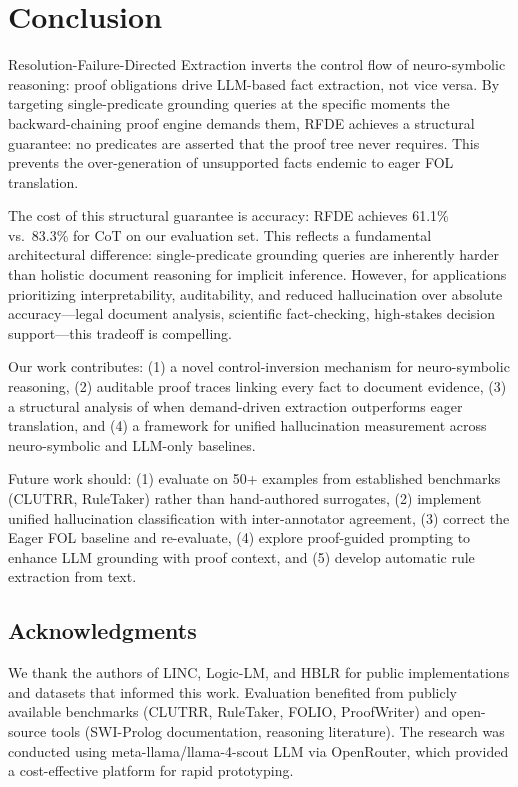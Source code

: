 \documentclass[11pt,letterpaper]{article}
\begin{document}
\section{Conclusion}

Resolution-Failure-Directed Extraction inverts the control flow of neuro-symbolic reasoning: proof obligations drive
LLM-based fact extraction, not vice versa. By targeting single-predicate grounding queries at the specific moments the
backward-chaining proof engine demands them, RFDE achieves a structural guarantee: no predicates are asserted that the proof
tree never requires. This prevents the over-generation of unsupported facts endemic to eager FOL translation.

The cost of this structural guarantee is accuracy: RFDE achieves 61.1\% vs.\ 83.3\% for CoT on our evaluation set. This
reflects a fundamental architectural difference: single-predicate grounding queries are inherently harder than holistic
document reasoning for implicit inference. However, for applications prioritizing interpretability, auditability, and reduced
hallucination over absolute accuracy---legal document analysis, scientific fact-checking, high-stakes decision support---this
tradeoff is compelling.

Our work contributes: (1) a novel control-inversion mechanism for neuro-symbolic reasoning, (2) auditable proof traces
linking every fact to document evidence, (3) a structural analysis of when demand-driven extraction outperforms eager
translation, and (4) a framework for unified hallucination measurement across neuro-symbolic and LLM-only baselines.

Future work should: (1) evaluate on 50+ examples from established benchmarks (CLUTRR, RuleTaker) rather than hand-authored
surrogates, (2) implement unified hallucination classification with inter-annotator agreement, (3) correct the Eager FOL
baseline and re-evaluate, (4) explore proof-guided prompting to enhance LLM grounding with proof context, and (5) develop
automatic rule extraction from text.

\subsection*{Acknowledgments}

We thank the authors of LINC, Logic-LM, and HBLR for public implementations and datasets that informed this work. Evaluation
benefited from publicly available benchmarks (CLUTRR, RuleTaker, FOLIO, ProofWriter) and open-source tools (SWI-Prolog
documentation, reasoning literature). The research was conducted using meta-llama/llama-4-scout LLM via OpenRouter, which
provided a cost-effective platform for rapid prototyping.



\end{document}
